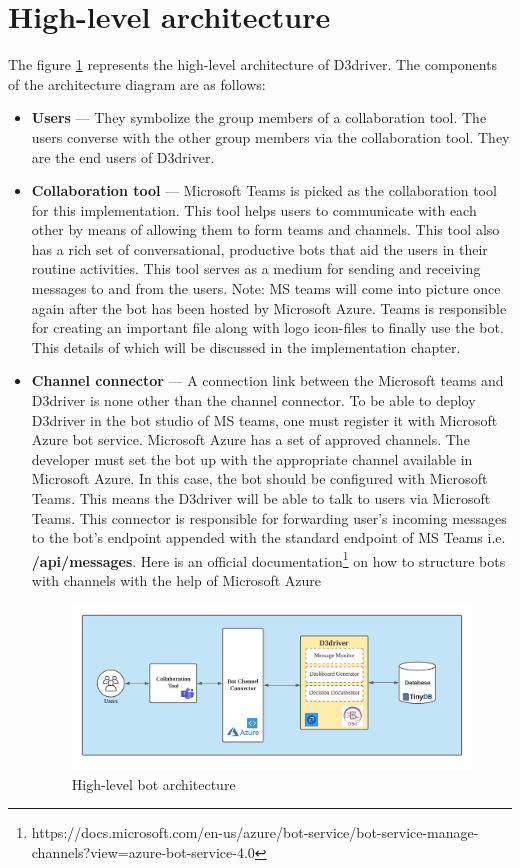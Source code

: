 \section{High-level architecture}
The figure \ref{fig:archibotnew} represents the high-level architecture of D3driver. The components of the architecture diagram are as follows:


\begin{itemize}
\item \textbf{Users} --- They symbolize the group members of a collaboration tool. The users converse with the other group members via the collaboration tool. They are the end users of D3driver. 

\item\textbf{ Collaboration tool} --- Microsoft Teams is picked as the collaboration tool for this implementation. This tool helps users to communicate with each other by means of allowing them to form teams and channels. This tool also has a rich set of conversational, productive bots that aid the users in their routine activities. This tool serves as a medium for sending and receiving messages to and from the users. Note: MS teams will come into picture once again after the bot has been hosted by Microsoft Azure. Teams is responsible for creating an important file along with logo icon-files to finally use the bot. This details of which will be discussed in the implementation chapter.

\item \textbf{Channel connector} --- A connection link between the Microsoft teams and D3driver is none other than the channel connector. To be able to deploy D3driver in the bot studio of MS teams, one must register it with Microsoft Azure bot service. Microsoft Azure has a set of approved channels. The developer must set the bot up with the appropriate channel available in Microsoft Azure. In this case, the bot should be configured with Microsoft Teams. This means the D3driver will be able to talk to users via Microsoft Teams. This connector is responsible for forwarding user’s incoming messages to the bot’s endpoint appended with the standard endpoint of MS Teams i.e. \textbf{/api/messages}. Here is an official documentation\footnote{https://docs.microsoft.com/en-us/azure/bot-service/bot-service-manage-channels?view=azure-bot-service-4.0} on how to structure bots with channels with the help of Microsoft Azure

\begin{figure}[h]
\centering
\includegraphics[width=1.1\linewidth]{figures/archibotnew}
\captionsetup{justification=centering}
\caption{ High-level bot architecture}
\label{fig:archibotnew}
\end{figure}



\end{itemize}
